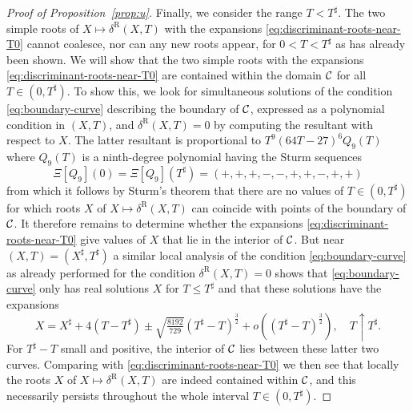 \begin{proof}[Proof of Proposition~\ref{prop:u}]
Finally, we consider the range $T<T^\sharp$.  The two simple roots of $X\mapsto\delta^\mathrm{R}(X,T)$ with the expansions \eqref{eq:discriminant-roots-near-T0} cannot coalesce, nor can any new roots appear, for $0<T<T^\sharp$ as has already been shown.  We will show that the two simple roots with the expansions \eqref{eq:discriminant-roots-near-T0} are contained within the domain $\mathcal{C}$ for all $T\in (0,T^\sharp)$. To show this, we look for simultaneous solutions of the condition \eqref{eq:boundary-curve} describing the boundary of $\mathcal{C}$, expressed as a polynomial condition in $(X,T)$, and $\delta^\mathrm{R}(X,T)=0$ by computing the resultant with respect to $X$.  The latter resultant is proportional to $T^9(64T-27)^6Q_9(T)$ where $Q_9(T)$ is a ninth-degree polynomial having the Sturm sequences
\begin{equation}
\Xi[Q_9](0)=\Xi[Q_9](T^\sharp)=(+,+,+,-,-,+,+,-,+,+)
\end{equation}
from which it follows by Sturm's theorem that there are no values of $T\in (0,T^\sharp)$ for which roots $X$ of $X\mapsto\delta^\mathrm{R}(X,T)$ can coincide with points of the boundary of $\mathcal{C}$.  It therefore remains to determine whether the expansions \eqref{eq:discriminant-roots-near-T0} give values of $X$ that lie in the interior of $\mathcal{C}$.  But near $(X,T)=(X^\sharp,T^\sharp)$ a similar local analysis of the condition \eqref{eq:boundary-curve} as already performed for the condition $\delta^\mathrm{R}(X,T)=0$ shows that \eqref{eq:boundary-curve} only has real solutions $X$ for $T\le T^\sharp$ and that these solutions have the expansions
\begin{equation}
X=X^\sharp+4(T-T^\sharp)\pm\sqrt{\tfrac{8192}{729}}(T^\sharp-T)^\frac{3}{2}+o((T^\sharp-T)^\frac{3}{2}),\quad T\uparrow T^\sharp.
\label{eq:ChannelsBoundaryNearX0T0}
\end{equation}
For $T^\sharp-T$ small and positive, the interior of $\mathcal{C}$ lies between these latter two curves.
Comparing with \eqref{eq:discriminant-roots-near-T0} we then see that locally the roots $X$ of $X\mapsto\delta^\mathrm{R}(X,T)$ are indeed contained within $\mathcal{C}$, and this necessarily persists throughout the whole interval $T\in (0,T^\sharp)$.


\end{proof}
